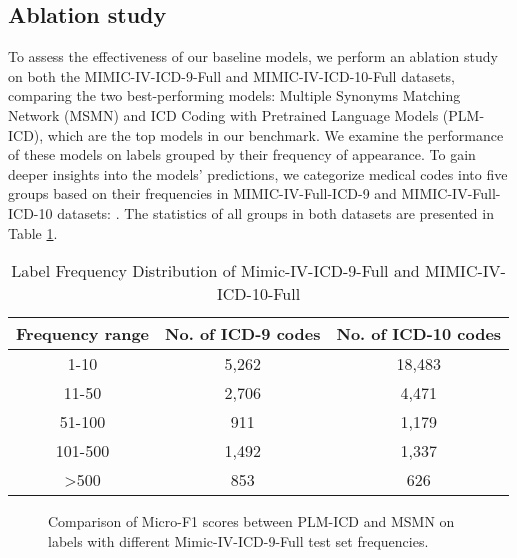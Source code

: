 \documentclass[11pt]{article}
\begin{document}
\subsection{Ablation study}
To assess the effectiveness of our baseline models, we perform an ablation study on both the MIMIC-IV-ICD-9-Full and MIMIC-IV-ICD-10-Full datasets, comparing the two best-performing models: Multiple Synonyms Matching Network (MSMN) and ICD Coding with Pretrained Language Models (PLM-ICD), which are the top models in our benchmark. We examine the performance of these models on labels grouped by their frequency of appearance. To gain deeper insights into the models' predictions, we categorize medical codes into five groups based on their frequencies in MIMIC-IV-Full-ICD-9 and MIMIC-IV-Full-ICD-10 datasets: . The statistics of all groups in both datasets are presented in Table \ref{tab: label frequency distribution Mimic-IV-ICD}.
\begin{table}[!t]
\centering
\small
\begin{tabular}{ccc}
\toprule
Frequency range & No. of ICD-9 codes  & No. of ICD-10 codes\\
\midrule
1-10 &5,262 & 18,483 \\
11-50 &2,706 & 4,471 \\
51-100 & 911 & 1,179\\
101-500 & 1,492& 1,337 \\
>500 & 853 & 626\\
\bottomrule
\end{tabular}
\caption{Label Frequency Distribution of Mimic-IV-ICD-9-Full and MIMIC-IV-ICD-10-Full}\label{tab: label frequency distribution Mimic-IV-ICD}
\end{table}
\begin{figure}[!t]


    \caption{Comparison of Micro-F1 scores between PLM-ICD and MSMN on labels with different Mimic-IV-ICD-9-Full test set frequencies.}
    \label{fig:Micro F1 by label frequency group Mimic-IV-ICD-9}
\end{figure}
\end{document}
